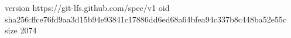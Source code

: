 version https://git-lfs.github.com/spec/v1
oid sha256:ffce76fd9aa3d15b94e93841c17886dd6ed68a64bfea94c337b8c448ba52e55c
size 2074
